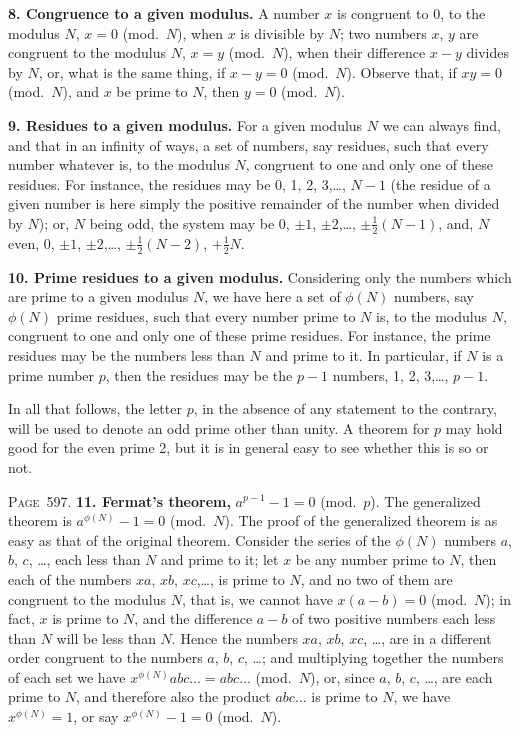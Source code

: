 \documentclass[11pt,a4paper]{article}
\theoremstyle{definition}
\begin{document}
\textbf{8. Congruence to a given modulus.} A number $x$ is congruent to 0, to the modulus $N$, $x=0$ (mod.\ $N$), when $x$ is divisible by $N$; two numbers $x$, $y$ are congruent to the modulus $N$, $x=y$ (mod.\ $N$), when their difference $x-y$ divides by $N$, or, what is the same thing, if $x-y=0$ (mod.\ $N$). Observe that, if $xy=0$ (mod.\ $N$), and $x$ be prime to $N$, then $y=0$ (mod.\ $N$).

\textbf{9. Residues to a given modulus.} For a given modulus $N$ we can always find, and that in an infinity of ways, a set of numbers, say residues, such that every number whatever is, to the modulus $N$, congruent to one and only one of these residues. For instance, the residues may be 0, 1, 2, 3,\ldots, $N-1$ (the residue of a given number is here simply the positive remainder of the number when divided by $N$); or, $N$ being odd, the system may be $0$, $\pm 1$, $\pm 2$,\ldots, $\pm\tfrac12(N-1)$, and, $N$ even, $0$, $\pm 1$, $\pm 2$,\ldots, $\pm\tfrac12(N-2)$, $+\tfrac12N$.

\textbf{10. Prime residues to a given modulus.} Considering only the numbers which are prime to a given modulus $N$, we have here a set of $\phi(N)$ numbers, say $\phi(N)$ prime residues, such that every number prime to $N$ is, to the modulus $N$, congruent to one and only one of these prime residues. For instance, the prime residues may be the numbers less than $N$ and prime to it. In particular, if $N$ is a prime number $p$, then the residues may be the $p-1$ numbers, 1, 2, 3,\ldots, $p-1$.

In all that follows, the letter $p$, in the absence of any statement to the contrary, will be used to denote an odd prime other than unity. A theorem for $p$ may hold good for the even prime 2, but it is in general easy to see whether this is so or not.

\newpage
\noindent\textsc{Page~597.} \textbf{11. Fermat's theorem,} $a^{p-1}-1=0$ (mod.\ $p$). The generalized theorem is $a^{\phi(N)}-1=0$ (mod.\ $N$). The proof of the generalized theorem is as easy as that of the original theorem. Consider the series of the $\phi(N)$ numbers $a$, $b$, $c$, \ldots, each less than $N$ and prime to it; let $x$ be any number prime to $N$, then each of the numbers $xa$, $xb$, $xc$,\ldots, is prime to $N$, and no two of them are congruent to the modulus $N$, that is, we cannot have $x(a-b)=0$ (mod.\ $N$); in fact, $x$ is prime to $N$, and the difference $a-b$ of two positive numbers each less than $N$ will be less than $N$. Hence the numbers $xa$, $xb$, $xc$, \ldots, are in a different order congruent to the numbers $a$, $b$, $c$, \ldots; and multiplying together the numbers of each set we have $x^{\phi(N)}abc\ldots=abc\ldots$ (mod.\ $N$), or, since $a$, $b$, $c$, \ldots, are each prime to $N$, and therefore also the product $abc\ldots$ is prime to $N$, we have $x^{\phi(N)}=1$, or say $x^{\phi(N)}-1=0$ (mod.\ $N$).
\end{document}
